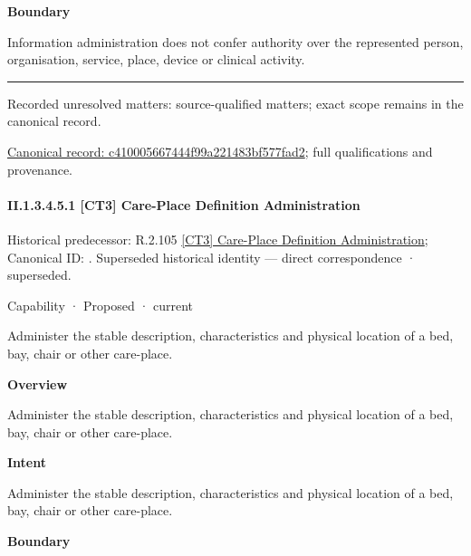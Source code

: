 \textbf{Boundary}



Information administration does not confer authority over the represented person, organisation, service, place, device or clinical activity.



\medskip\hrule\medskip

{\small Recorded unresolved matters: source-qualified matters; exact scope remains in the canonical record.}\par
{\footnotesize \href{../../../../continuum/strategy/capability/c410005667444f99a221483bf577fad2.md}{Canonical record: c410005667444f99a221483bf577fad2}; full qualifications and provenance.}\par
\paragraph*{II.1.3.4.5.1 [CT3] Care-Place Definition Administration}
\label{navigation:II.1.3.4.5.1}

{\small Historical predecessor: R.2.105 \hyperref[element:a3464bd9c0dc4a01b50803acc7705b4e]{[CT3] Care-Place Definition Administration}; Canonical ID: \texttt{}. Superseded historical identity — direct correspondence · superseded.}\par
\label{element:629b493c7d9844baa25c029a87ed04f6}
{\small Capability · Proposed · current}\par

Administer the stable description, characteristics and physical location of a bed, bay, chair or other care-place.



\textbf{Overview}



Administer the stable description, characteristics and physical location of a bed, bay, chair or other care-place.



\textbf{Intent}



Administer the stable description, characteristics and physical location of a bed, bay, chair or other care-place.



\textbf{Boundary}



